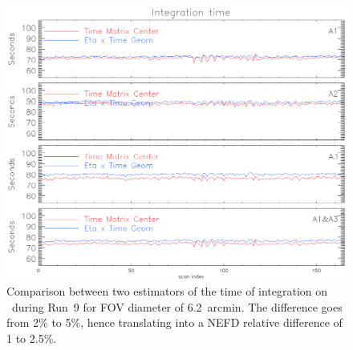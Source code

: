 \begin{figure}[!thbp]
\begin{center}
\includegraphics[clip, angle=0, scale =0.8]{Figures/time_of_integration_0.eps}
\caption[Time of integration]{Comparison between two estimators of the time of
  integration on \hls\ during Run~9 for FOV diameter of 6.2~arcmin. The
  difference goes from 2\% to 5\%, hence translating into a NEFD relative difference of 1
to 2.5\%.}
\label{fig:time_comparison}
\end{center}
\end{figure}




